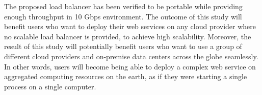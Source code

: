 The proposed load balancer has been verified to be portable while providing enough throughput in 10 Gbps environment.
The outcome of this study will benefit users who want to deploy their web services on any cloud provider where no scalable load balancer is provided, to achieve high scalability.
Moreover, the result of this study will potentially benefit users who want to use a group of different cloud providers and on-premise data centers across the globe seamlessly.
In other words, users will become being able to deploy a complex web service on aggregated computing resources on the earth, as if they were starting a single process on a single computer.


